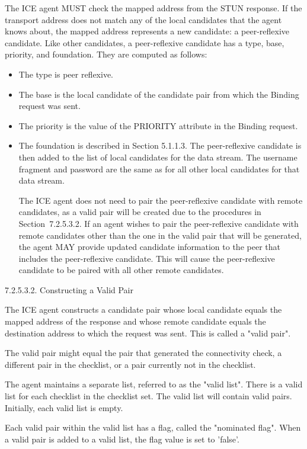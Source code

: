 \documentclass{article}
\begin{document}
The ICE agent MUST check the mapped address from the STUN response. If the transport address does not match any of the local candidates that the agent knows about, the mapped address represents a new candidate: a peer-reflexive candidate.  Like other candidates, a peer-reflexive candidate has a type, base, priority, and foundation. They are computed as follows:

\begin{itemize}
\item The type is peer reflexive.
\item The base is the local candidate of the candidate pair from which the Binding request was sent.
\item The priority is the value of the PRIORITY attribute in the Binding request.
\item The foundation is described in Section 5.1.1.3.
The peer-reflexive candidate is then added to the list of local candidates for the data stream.  The username fragment and password are the same as for all other local candidates for that data stream.

The ICE agent does not need to pair the peer-reflexive candidate with remote candidates, as a valid pair will be created due to the procedures in Section~7.2.5.3.2.  If an agent wishes to pair the peer-reflexive candidate with remote candidates other than the one in the valid pair that will be generated, the agent MAY provide updated candidate information to the peer that includes the peer-reflexive candidate.  This will cause the peer-reflexive candidate to be paired with all other remote candidates.

\end{itemize}
7.2.5.3.2.  Constructing a Valid Pair

The ICE agent constructs a candidate pair whose local candidate equals the mapped address of the response and whose remote candidate equals the destination address to which the request was sent.  This is called a "valid pair".

The valid pair might equal the pair that generated the connectivity check, a different pair in the checklist, or a pair currently not in the checklist.

The agent maintains a separate list, referred to as the "valid list". There is a valid list for each checklist in the checklist set.  The valid list will contain valid pairs.  Initially, each valid list is empty.

Each valid pair within the valid list has a flag, called the "nominated flag".  When a valid pair is added to a valid list, the flag value is set to 'false'.
\end{document}
